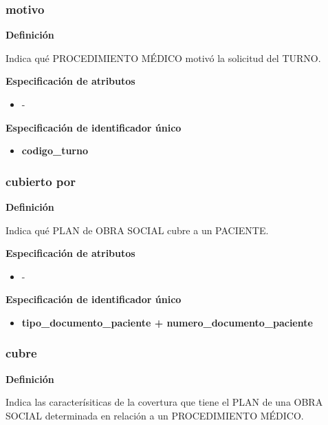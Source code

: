 \documentclass[a4paper,11pt]{article}
\begin{document}
\subsubsection{\textbf{motivo}}

\textbf{Definición}

Indica qué PROCEDIMIENTO MÉDICO motivó la solicitud del TURNO.

\textbf{Especificación de atributos}

\begin{itemize}
\item -
\end{itemize}

\textbf{Especificación de identificador único}

\begin{itemize}

     \item \textbf{codigo\_turno}

\end{itemize}

\subsubsection{\textbf{cubierto por}}

\textbf{Definición}

Indica qué PLAN de OBRA SOCIAL cubre a un PACIENTE.

\textbf{Especificación de atributos}

\begin{itemize}
\item -
\end{itemize}

\textbf{Especificación de identificador único}

\begin{itemize}

     \item \textbf{tipo\_documento\_paciente + numero\_documento\_paciente}

\end{itemize}

\subsubsection{\textbf{cubre}}

\textbf{Definición}

Indica las caracterísiticas de la covertura que tiene el PLAN de una 
OBRA SOCIAL determinada en relación a un PROCEDIMIENTO MÉDICO.
\end{document}
